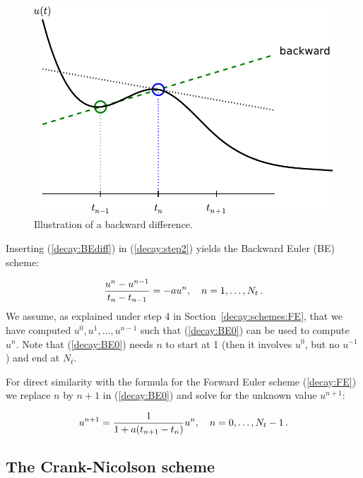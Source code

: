 \documentclass[%
oneside,                 %
final,                   %
10pt]{article}
\begin{document}
\begin{figure}[!ht]  %
  \centerline{\includegraphics[width=0.8\linewidth]{fig-alg/fd_backward.pdf}}
  \caption{
  Illustration of a backward difference. \label{decay:sketch:BE}
  }
\end{figure}



Inserting (\ref{decay:BEdiff}) in (\ref{decay:step2}) yields
the Backward Euler (BE) scheme:

\begin{equation}
\frac{u^{n}-u^{n-1}}{t_{n}-t_{n-1}} = -a u^n,\quad n=1,\ldots,N_t\thinspace .
\label{decay:BE0}
\end{equation}
We assume, as explained under step 4 in Section~\ref{decay:schemes:FE},
that we have computed $u^0, u^1, \ldots, u^{n-1}$ such that
(\ref{decay:BE0}) can be used to compute $u^n$. Note that
(\ref{decay:BE0}) needs $n$ to start at 1 (then it involves $u^0$, but
no $u^{-1}$) and end at $N_t$.

For direct similarity with the formula for the
Forward Euler scheme (\ref{decay:FE})
we replace $n$ by $n+1$ in (\ref{decay:BE0}) and solve for the
unknown value $u^{n+1}$:

\begin{equation}
u^{n+1} = \frac{1}{1+ a(t_{n+1}-t_n)} u^n,\quad n=0,\ldots,N_t-1\thinspace .
\label{decay:BE}
\end{equation}

\subsection{The Crank-Nicolson scheme}
\label{decay:schemes:CN}

 
\end{document}
